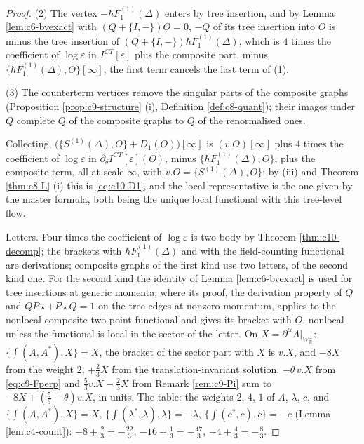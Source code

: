 \begin{proof}
(2) The vertex $-\hbar F_1^{(1)}(\Delta)$ enters by tree insertion, and by Lemma \ref{lem:c6-bvexact} with $(Q+\{I,-\})O=0$, $-Q$ of its tree insertion into $O$ is minus the tree insertion of $(Q+\{I,-\})\hbar F_1^{(1)}(\Delta)$, which is $4$ times the coefficient of $\log\varepsilon$ in $I^{CT}[\varepsilon]$ plus the composite part, minus $\{\hbar F_1^{(1)}(\Delta),O\}[\infty]$; the first term cancels the last term of (1).

(3) The counterterm vertices remove the singular parts of the composite graphs (Proposition \ref{prop:c9-structure} (i), Definition \ref{def:c8-quant}); their images under $Q$ complete $Q$ of the composite graphs to $Q$ of the renormalised ones.

Collecting, $\big(\{S^{(1)}(\Delta),O\}+D_1(O)\big)[\infty]$ is $(v.O)[\infty]$ plus $4$ times the coefficient of $\log\varepsilon$ in $\partial_\delta I^{CT}[\varepsilon](O)$, minus $\{\hbar F_1^{(1)}(\Delta),O\}$, plus the composite term, all at scale $\infty$, with $v.O=\{S^{(1)}(\Delta),O\}$; by (iii) and Theorem \ref{thm:c8-L} (i) this is \eqref{eq:c10-D1}, and the local representative is the one given by the master formula, both being the unique local functional with this tree-level flow.

Letters. Four times the coefficient of $\log\varepsilon$ is two-body by Theorem \ref{thm:c10-decomp}; the brackets with $\hbar F_1^{(1)}(\Delta)$ and with the field-counting functional are derivations; composite graphs of the first kind use two letters, of the second kind one. For the second kind the identity of Lemma \ref{lem:c6-bvexact} is used for tree insertions at generic momenta, where its proof, the derivation property of $Q$ and $QP\star+P\star Q=1$ on the tree edges at nonzero momentum, applies to the nonlocal composite two-point functional and gives its bracket with $O$, nonlocal unless the functional is local in the sector of the letter. On $X=\partial^\alpha A|_{W_{\mathbb R}^\perp}$: $\{\int(A,A^*),X\}=X$, the bracket of the sector part with $X$ is $v.X$, and $-8X$ from the weight $2$, $+\tfrac23X$ from the translation-invariant solution, $-\theta\,v.X$ from \eqref{eq:c9-Fperp} and $\tfrac53v.X-\tfrac23X$ from Remark \ref{rem:c9-Pi} sum to $-8X+(\tfrac53-\theta)v.X$, in units. The table: the weights $2$, $4$, $1$ of $A$, $\lambda$, $c$, and $\{\int(A,A^*),X\}=X$, $\{\int(\lambda^*,\lambda),\lambda\}=-\lambda$, $\{\int(c^*,c),c\}=-c$ (Lemma \ref{lem:c4-count}): $-8+\tfrac23=-\tfrac{22}3$, $-16+\tfrac13=-\tfrac{47}3$, $-4+\tfrac43=-\tfrac83$.
\end{proof}

